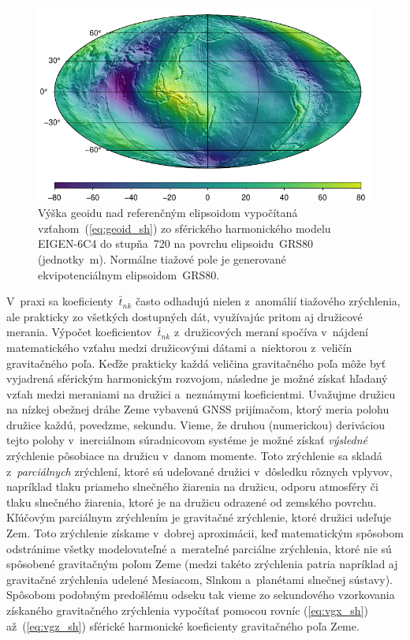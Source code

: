 \documentclass[a4paper, 12pt]{book}
\begin{document}
\begin{figure}
\centering
\includegraphics{./fig-geoid-ggm.pdf}
\caption{Výška geoidu nad referenčným elipsoidom vypočítaná 
vzťahom~(\ref{eq:geoid_sh}) zo sférického harmonického modelu EIGEN-6C4 do 
stupňa~720 na povrchu elipsoidu~GRS80 (jednotky~m).  Normálne tiažové pole je 
generované ekvipotenciálnym elipsoidom~GRS80.}
\label{fig:geoid_ggm}
\end{figure}

V~praxi sa koeficienty~$\bar{t}_{nk}$ často odhadujú nielen z~anomálií 
tiažového zrýchlenia, ale prakticky zo všetkých dostupných dát, využívajúc 
pritom aj družicové merania.  Výpočet koeficientov~$\bar{t}_{nk}$ z~družicových 
meraní spočíva v~nájdení matematického vzťahu medzi družicovými dátami 
a~niektorou z~veličín gravitačného poľa.  Keďže prakticky každá veličina 
gravitačného poľa môže byť vyjadrená sférickým harmonickým rozvojom, následne 
je možné získať hľadaný vzťah medzi meraniami na družici a~neznámymi 
koeficientmi.  Uvažujme družicu na nízkej obežnej dráhe Zeme vybavenú GNSS 
prijímačom, ktorý meria polohu družice každú, povedzme, sekundu.  Vieme, že 
druhou (numerickou) deriváciou tejto polohy v~inerciálnom súradnicovom systéme 
je možné získať \emph{výsledné} zrýchlenie pôsobiace na družicu v~danom 
momente.  Toto zrýchlenie sa skladá z~\emph{parciálnych} zrýchlení, ktoré sú 
udeľované družici v~dôsledku rôznych vplyvov, napríklad tlaku priameho 
slnečného žiarenia na družicu, odporu atmosféry či tlaku slnečného žiarenia, 
ktoré je na družicu odrazené od zemského povrchu.  Kľúčovým parciálnym 
zrýchlením je gravitačné zrýchlenie, ktoré družici udeľuje Zem.  Toto 
zrýchlenie získame v~dobrej aproximácii, keď matematickým spôsobom odstránime 
všetky modelovateľné a~merateľné parciálne zrýchlenia, ktoré nie sú spôsobené 
gravitačným poľom Zeme (medzi takéto zrýchlenia patria napríklad aj gravitačné 
zrýchlenia udelené Mesiacom, Slnkom a~planétami slnečnej sústavy).  Spôsobom 
podobným predošlému odseku tak vieme zo sekundového vzorkovania získaného 
gravitačného zrýchlenia vypočítať pomocou rovníc (\ref{eq:vgx_sh}) 
až~(\ref{eq:vgz_sh}) sférické harmonické koeficienty gravitačného poľa Zeme.
\end{document}
